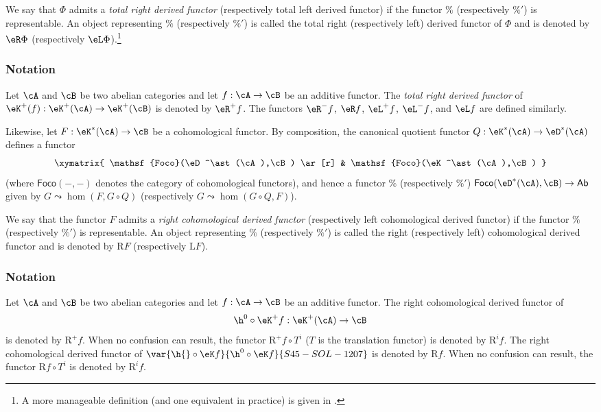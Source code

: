\begin{definition}\label{VIII:4-1-2}
We say that $\Phi$ admits a \emph{total right derived functor}
(respectively total left derived functor) if the functor $\%$
(respectively $\%'$) is representable. An object representing $\%$
(respectively $\%'$) is called the total right (respectively left) derived
functor of $\Phi$ and is denoted by $\eR \Phi$ (respectively
$\eL \Phi$).\footnote{A more manageable definition (and one equivalent in
practice) is given in \cite[XVII 1.2]{sga4}.}
\end{definition}

\subsubsection{Notation}\label{VIII:4-1-3}

Let $\cA$ and $\cB$ be two abelian categories and let $f:\cA\to \cB$ be
an additive functor. The \emph{total right derived functor} of
$\eK^+(f):\eK^+(\cA) \to \eK^+(\cB)$ is denoted by $\eR^+ f$. The
functors $\eR^- f$, $\eR f$, $\eL^+ f$, $\eL^- f$, and $\eL f$ are
defined similarly.

Likewise, let $F:\eK^\ast(\cA) \to \cB$ be a cohomological functor.
By composition, the canonical quotient functor
$Q:\eK^\ast(\cA) \to \eD^\ast(\cA)$ defines a functor
\[\xymatrix{
  \mathsf{Foco}(\eD^\ast(\cA),\cB) \ar[r]
    & \mathsf{Foco}(\eK^\ast(\cA),\cB)
}\]
(where $\mathsf{Foco}(-,-)$ denotes the category of cohomological
functors), and hence a functor $\%$ (respectively $\%'$)
$\mathsf{Foco}(\eD^\ast(\cA),\cB) \to \mathsf{Ab}$ given by
$G\leadsto \hom(F,G\circ Q)$ (respectively
$G\leadsto \hom(G\circ Q,F)$).

\begin{definition}\label{VIII:4-1-4}
We say that the functor $F$ admits a \emph{right cohomological derived
functor} (respectively left cohomological derived functor) if the functor
$\%$ (respectively $\%'$) is representable. An object representing $\%$
(respectively $\%'$) is called the right (respectively left)
cohomological derived functor and is denoted by $\mathrm{R} F$ (respectively
$\mathrm{L} F$).
\end{definition}

\subsubsection{Notation}\label{VIII:4-1-5}

Let $\cA$ and $\cB$ be two abelian categories and let $f:\cA\to \cB$ be
an additive functor. The right cohomological derived functor of
\[
  \h^0{}\circ \eK^+ f:\eK^+(\cA) \to \cB
\]
is denoted by $\mathrm{R}^+ f$. When no confusion can result, the functor
$\mathrm{R}^+ f\circ T^i$ ($T$ is the translation functor) is denoted by
$\mathrm{R}^i f$. The right cohomological derived functor of
$\var{\h{}\circ \eK f}{\h^0{}\circ \eK f}{S45-SOL-1207}$ is denoted by $\mathrm{R} f$. When no confusion can result,
the functor $\mathrm{R} f\circ T^i$ is denoted by $\mathrm{R}^i f$.

